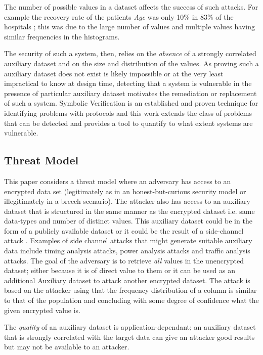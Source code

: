 \documentclass[journal]{IEEEtran}
\begin{document}
The number of possible values in a dataset affects the success of such attacks. For example the recovery rate of the patients \textit{ Age} was only 10\% in 83\% of the hospitals \cite{InfrenceAttacks}; this was due to the large number of values and multiple values having similar frequencies in the histograms.

The security of such a system, then, relies on the \textit{absence} of a strongly correlated auxiliary dataset and on the size and distribution of the values. 
As proving such a auxiliary dataset does not exist is likely impossible or at the very least impractical to know at design time, detecting that a system is vulnerable in the presence of particular auxiliary dataset motivates the remediation or replacement of such a system.
Symbolic Verification is an established and proven technique for identifying problems with protocols and this work extends the class of problems that can be detected and provides a tool to quantify to what extent systems are vulnerable.


\subsection{Threat Model}
This paper considers a threat model where an adversary has access to an encrypted data set (legitimately as in an honest-but-curious security model or illegitimately in a breech scenario). 
The attacker also has access to an auxiliary dataset that is structured in the same manner as the encrypted dataset i.e. same data-types and number of distinct values. This auxiliary dataset could be in the form of a publicly available dataset or it could be the result of a side-channel attack \cite{Kocher96}. Examples of side channel attacks that might generate suitable auxiliary data include timing analysis attacks, power analysis attacks and traffic analysis attacks\cite{SideChannelSurvey}.
The goal of the adversary is to retrieve \textit{all} values in the unencrypted dataset; either because it is of direct value to them or it can be used as an additional Auxiliary dataset to attack another encrypted dataset. 
The attack is based on the attacker using that the frequency distribution of a column is similar to that of the population and concluding with some degree of confidence what the  given encrypted value is. 

The \textit{quality} of an auxiliary dataset is application-dependant\cite{InfrenceAttacks}; an auxiliary dataset that is strongly correlated with the target data can give an attacker good results but may not be available to an attacker. 
\end{document}
